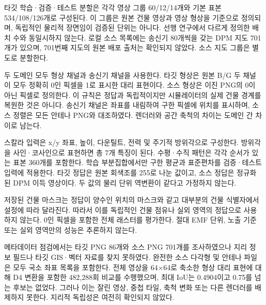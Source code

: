 \documentclass[10pt,a4paper]{article}
\begin{document}
타깃 학습·검증·테스트 분할은 각각 영상 그룹 60/12/14개와 기본 표본 534/108/126개로 구성된다. 이 그룹은 원본 건물 영상과 영상 형상을 기준으로 정의되며, 독립적인 물리적 장면임이 검증된 단위는 아니다. 선행 연구에서 다르게 정의한 배치 수와 동일시하지 않는다. 로컬 소스 목록에는 송신기 80개씩을 갖는 DPM 지도 701개가 있으며, 701번째 지도의 원본 배포 출처는 확인되지 않았다. 소스 지도 그룹은 별도로 분할한다.

두 도메인 모두 형상 채널과 송신기 채널을 사용한다. 타깃 형상은 원본 B/G 두 채널이 모두 정확히 0인 픽셀을 1로 표시한 대리 표현이다. 소스 형상은 이진 PNG의 0이 아닌 픽셀로 정의한다. 이 규칙은 정답과 독립적이지만 시뮬레이터의 실제 건물 경계를 복원한 것은 아니다. 송신기 채널은 좌표를 내림하여 구한 픽셀에 위치를 표시하며, 소스 정렬은 모든 안테나 PNG와 대조하였다. 렌더러와 공간 축척의 차이는 도메인 간 차이로 남는다.

스칼라 입력은 x/y 좌표, 높이, 다운틸트, 전력 및 주기적 방위각으로 구성한다. 방위각을 사인·코사인으로 표현하면 총 7개 특징이 된다. 수평·수직 패턴은 각각 순서가 있는 표본 360개를 포함한다. 학습 부분집합에서만 구한 평균과 표준편차를 검증·테스트 입력에 적용한다. 타깃 정답은 원본 회색조를 255로 나눈 값이고, 소스 정답은 정규화된 DPM 이득 영상이다. 두 값의 물리 단위 역변환이 같다고 가정하지 않는다.

저장된 건물 마스크는 정답이 양수인 위치의 마스크와 같고 대부분의 건물 식별자에서 설정에 따라 달라진다. 따라서 이를 독립적인 건물 점유나 실외 영역의 정답으로 사용하지 않는다. 0인 픽셀을 포함한 전체 래스터를 평가한다. 절대 EMF 단위, 노출 기준 또는 실외 영역만의 성능은 추론하지 않는다.

메타데이터 점검에서는 타깃 PNG 86개와 소스 PNG 701개를 조사하였으나 지리 정보 필드나 타깃 GIS·벡터 자료를 찾지 못하였다. 완전한 소스 다각형 및 안테나 파일은 모두 국소 좌표 목록을 포함한다. 전체 영상을 64×64로 축소한 형상 대리 표현에 대해 D4 변환을 포함한 482,288회 비교를 수행했으며, 최대 IoU는 0.4904이고 0.75를 넘는 후보는 없었다. 그러나 이는 잘린 영상, 중첩 타일, 축척 변화 또는 다른 렌더러를 배제하지 못한다. 지리적 독립성은 여전히 확인되지 않았다.

\begin{table}[htbp]\centering\small
\caption{표 1}
\end{table}
\end{document}
